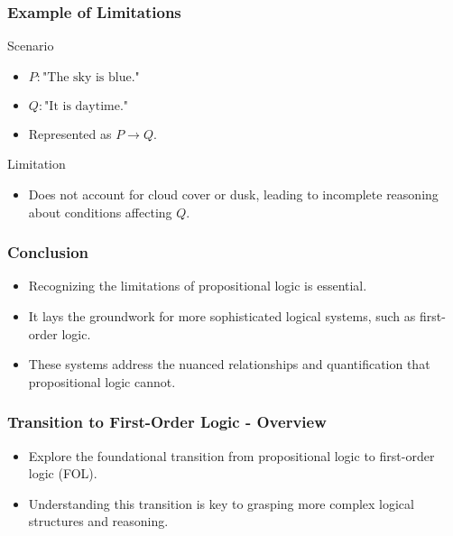 \documentclass[aspectratio=169]{beamer}
\begin{document}
\begin{frame}[fragile]
    \frametitle{Example of Limitations}
    \begin{block}{Scenario}
        \begin{itemize}
            \item \( P: \text{"The sky is blue."} \)
            \item \( Q: \text{"It is daytime."} \)
            \item Represented as \( P \rightarrow Q \).
        \end{itemize}
    \end{block}
    
    \begin{block}{Limitation}
        \begin{itemize}
            \item Does not account for cloud cover or dusk, leading to incomplete reasoning about conditions affecting \( Q \).
        \end{itemize}
    \end{block}
\end{frame}

\begin{frame}[fragile]
    \frametitle{Conclusion}
    \begin{itemize}
        \item Recognizing the limitations of propositional logic is essential.
        \item It lays the groundwork for more sophisticated logical systems, such as first-order logic.
        \item These systems address the nuanced relationships and quantification that propositional logic cannot.
    \end{itemize}
\end{frame}

\begin{frame}[fragile]
    \frametitle{Transition to First-Order Logic - Overview}
    \begin{itemize}
        \item Explore the foundational transition from propositional logic to first-order logic (FOL).
        \item Understanding this transition is key to grasping more complex logical structures and reasoning.
    \end{itemize}
\end{frame}
\end{document}
